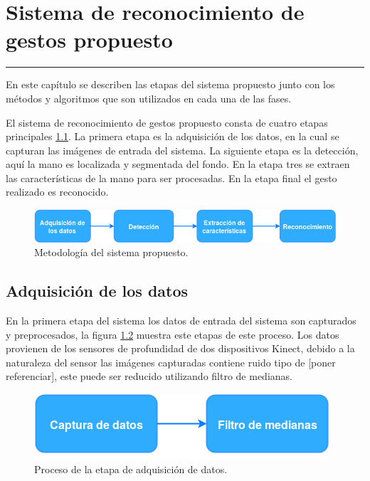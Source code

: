 \chapter{Sistema de reconocimiento de gestos propuesto}\label{capit:cap3}
\vspace{-2.0325ex}%
\noindent
\rule{\textwidth}{0.5pt}
\vspace{-5.5ex}%
\newcommand{\pushline}{\Indp}%

En este cap\'itulo se describen las etapas del sistema propuesto junto con los métodos y algoritmos que son utilizados en cada una de las fases.
 
El sistema de reconocimiento de gestos propuesto consta de cuatro etapas principales \ref{fig:MyHGR}. La primera etapa es la adquisición de los datos, en la cual se capturan las imágenes de entrada del sistema. La siguiente etapa es la detección, aquí la mano es localizada y segmentada del fondo. En la etapa tres se extraen las características de la mano para ser procesadas. En la etapa final el gesto realizado es reconocido.   

\begin{figure}[h!]
\begin{center}
\includegraphics[scale=.6]{./Figures/MyHGR.png}
\end{center}
\caption{Metodología del sistema propuesto.}
\label{fig:MyHGR}
\end{figure}  
  
\section{Adquisición de los datos}\label{sec:KinectSensor} 

En la primera etapa del sistema los datos de entrada del sistema son capturados y preprocesados, la figura \ref{fig:Dadquisicion} muestra este etapas de este proceso. Los datos provienen de los sensores de profundidad de dos dispositivos Kinect, debido a la naturaleza del sensor las imágenes capturadas contiene ruido tipo de [poner referenciar], este puede ser reducido utilizando filtro de medianas.

\begin{figure}[h!]
\begin{center}
\includegraphics[scale=.6]{./Figures/Adquisicion.png}
\end{center}
\caption{Proceso de la etapa de adquisición de datos.} 
\label{fig:Dadquisicion}
\end{figure}   


